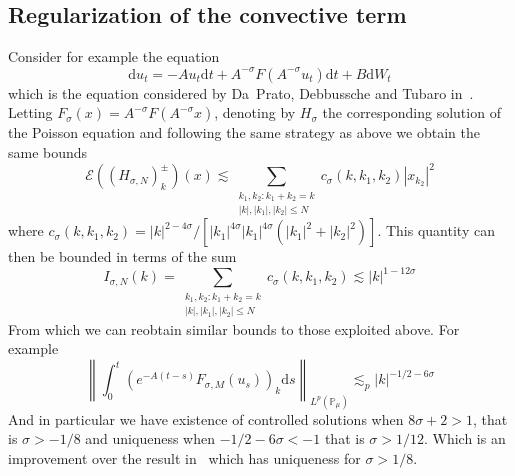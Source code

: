 \documentclass[11pt,a4paper,draft,reqno]{amsart}
\newcommand{\PP}{\mathbb{P}}
\newcommand{\cE}{\mathcal{E}}
\newcommand{\dd}{\mathrm{d}}
\begin{document}
\subsection{Regularization of the convective term}
 Consider for example the equation
\begin{equation}
\label{eq:burgers-daprato}
\dd u_t = - A u_t \dd t + A^{-\sigma}F(A^{-\sigma} u_t) \dd t + B \dd W_t 
\end{equation}
which is the equation considered by Da~Prato, Debbussche and Tubaro in~\cite{DDT}. Letting $F_\sigma(x) = A^{-\sigma}F(A^{-\sigma} x)$, denoting by $H_\sigma$ the corresponding solution of the Poisson equation and following the same strategy as above we obtain the same bounds
$$
 \cE((H_{\sigma,N})^\pm_k)(x)\lesssim     \sum_{\substack{k_1,k_2 :k_1+k_2=k\\|k|,|k_1|,|k_2|\le N}}c_\sigma(k,k_1,k_2) |x_{k_2}|^2  
$$
where $c_\sigma(k,k_1,k_2) = |k|^{2-4\sigma}/[|k_1|^{4\sigma}|k_1|^{4\sigma}(|k_1|^{2}+|k_2|^{2})]$.
This quantity can then be bounded in terms of the sum
$$
I_{\sigma,N}(k) = \sum_{\substack{k_1,k_2 :k_1+k_2=k\\|k|,|k_1|,|k_2|\le N}}c_\sigma(k,k_1,k_2) \lesssim |k|^{1-12\sigma}
$$
From which we can reobtain similar bounds to those exploited above.
For example
$$
\left\|\int_0^t (e^{-A(t-s)}F_{\sigma,M}(u_s))_k \dd  s \right\|_{L^p(\PP_\mu)}\lesssim_p |k|^{-1/2-6\sigma} 
$$
And in particular we have existence of controlled solutions when $8\sigma+2>1$, that is $\sigma>-1/8$ and uniqueness when $-1/2-6\sigma<-1$ that is $\sigma> 1/12$. Which is an improvement over the result in~\cite{DDT} which has uniqueness for $\sigma>1/8$. 
\end{document}
